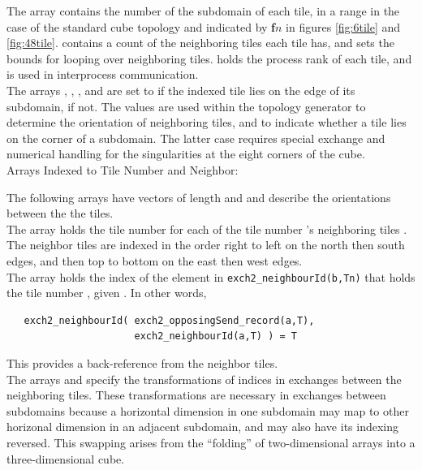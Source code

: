 The array  contains the number of
the subdomain of each tile, in a range  in the case of the
standard cube topology and indicated by \textbf{\textsf{f}}$n$ in
figures \ref{fig:6tile} and
\ref{fig:48tile}. 
contains a count of the neighboring tiles each tile has, and sets 
the bounds for looping over neighboring tiles.
 holds the process rank of each
tile, and is used in interprocess communication.  \\


The arrays ,
,
, and
 are set to  if the
indexed tile lies on the edge of its subdomain,  if
not.  The values are used within the topology generator to determine
the orientation of neighboring tiles, and to indicate whether a tile
lies on the corner of a subdomain.  The latter case requires special
exchange and numerical handling for the singularities at the eight
corners of the cube. \\


Arrays Indexed to Tile Number and Neighbor:

The following arrays have vectors of length  and
 and describe the orientations between the the tiles. \\

The array  holds the tile number
 for each of the tile number 's neighboring tiles
.  The neighbor tiles are indexed
 in the order right to left on the
north then south edges, and then top to bottom on the east then west
edges.  \\

 The  array holds the
index  of the element in \texttt{exch2\_neighbourId(b,Tn)}
that holds the tile number , given
.  In other words,
\begin{verbatim}
   exch2_neighbourId( exch2_opposingSend_record(a,T),
                      exch2_neighbourId(a,T) ) = T
\end{verbatim}
This provides a back-reference from the neighbor tiles. \\

The arrays  and
 specify the transformations of indices
in exchanges between the neighboring tiles.  These transformations are
necessary in exchanges between subdomains because a horizontal dimension 
in one subdomain 
may map to other horizonal dimension in an adjacent subdomain, and
may also have its indexing reversed. This swapping arises from the
``folding'' of two-dimensional arrays into a three-dimensional
cube. \\

